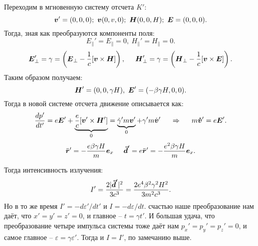 Переходим в мгновенную систему отсчета $K'$:
\begin{equation*}
    \mbox{\boldmath $v$}'= (0,0,0); \ \mbox{\boldmath $v$}(0,v,0);
    \ \mbox{\boldmath $H$}(0,0,H); \ \mbox{\boldmath $E$} = (0,0,0).
\end{equation*}
Тогда, зная как преобразуются компоненты поля:
\begin{equation*}
    E_\parallel' = E_\parallel = 0, \
    H_\parallel' = H_\parallel = 0.
\end{equation*}
\begin{equation*}
    \mbox{\boldmath $E$}_\perp' = \gamma = \left(\mbox{\boldmath $E$}_\perp - \frac{1}{c}[\mbox{\boldmath $v$}\times \mbox{\boldmath $H$}]\right),
    \hspace{5 mm} 
    \mbox{\boldmath $H$}_\perp' = \gamma = \left(\mbox{\boldmath $H$}_\perp - \frac{1}{c}[\mbox{\boldmath $v$}\times \mbox{\boldmath $E$}]\right).
\end{equation*}
Таким образом получаем:
\begin{equation*}
    \mbox{\boldmath $H$}' = (0,0, \gamma H),
    \
    \mbox{\boldmath $E$}' = (- \beta\gamma H, 0,0).
\end{equation*}
Тогда в новой системе отсчета движение описывается как:
\begin{equation*}
    \frac{d p'}{d t'} = e \mbox{\boldmath $E$}' + \underbrace{\frac{e}{c}[\mbox{\boldmath $v$}' \times \mbox{\boldmath $H$}']}_{0} = \underbrace{\dot{\gamma}' m \mbox{\boldmath $v$}'}_{0} + \gamma' m \dot{\mbox{\boldmath $v$}}'
    \hspace{0.5 cm}
    \Rightarrow
    \hspace{0.5 cm}
    m \mbox{\boldmath $\dot{v}$}' = e \mbox{\boldmath $E$}'.
\end{equation*}
\begin{equation*}
    \ddot{\mbox{\boldmath $r$}}' = - \frac{e \beta \gamma H}{m} \mbox{\boldmath $e$}_x
    \hspace{0.5 cm}
    \mbox{\boldmath $\ddot{d}$}' = e \ddot{\mbox{\boldmath $r$}}' = - \frac{e^2 \beta \gamma H}{m} \mbox{\boldmath $e$}_x.
\end{equation*}


Тогда интенсивность излучения:
\begin{equation*}
    I' = \frac{2 |\mbox{\boldmath $\ddot{d}$}'|^2}{3 c^3} = \frac{2 e^4 \beta^2 \gamma^2 H^2}{3 m^2 c^3}.
\end{equation*}
Но в то же время $I' = - d\varepsilon' / d t'$  и $I = -d \varepsilon /d t$.
 счастью наше преобразование нам даёт, что $x'=y'=z'=0$, и главное -- $t = \gamma t'$.
 И большая удача, что преобразование четыре импульса системы тоже даёт нам $p_x'=p_y'=p_z'=0$, и самое главное -- $\varepsilon = \gamma \varepsilon'$.
 Тогда и $I = I'$, по замечанию выше.